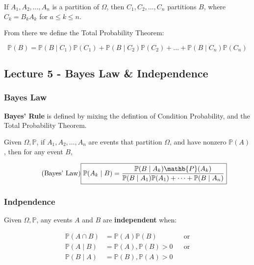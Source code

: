 \documentclass{article}
\begin{document}
If $A_1, A_2, \dots, A_n$ is a partition of $\Omega$, then $C_1, C_2,
\dots, C_n$ partitions $B$, where $C_k = B_k A_k$ for $a \leq k \leq
n$.

From there we define the Total Probability Theorem:

\begin{equation}
  \tag{Total Probability Theorem}
  \boxed{
    \mathbb{P}(B) = \mathbb{P}(B \mid C_1) \mathbb{P}(C_1) +
    \mathbb{P}(B \mid C_2) \mathbb{P}(C_2) + \dots + \mathbb{P}(B \mid
    C_n) \mathbb{P}(C_n)
  }
\end{equation}


\subsection{Lecture 5 - Bayes Law \& Independence}

\subsubsection{Bayes Law}

\textbf{Bayes' Rule} is defined by mixing the defintion of Condition
Probability, and the Total Probability Theorem.

Given $\Omega, \mathbb{P}$, if $A_1, A_2, \dots, A_n$ are events that
partition $\Omega$, and have nonzero $\mathbb{P}(A)$, then for any
event $B$,

\begin{equation}
  \tag{Bayes' Law}
  \boxed{
    \mathbb{P}(A_k \mid B) =
    \frac{\mathbb{P}(B \mid A_k) \mathb{P}(A_k)}
    {\mathbb{P}(B \mid A_1) \mathbb{P}(A_1) + \dots + \mathbb{P}(B
      \mid A_n)}
  }
\end{equation}

\subsubsection{Indpendence}

Given $\Omega, \mathbb{P}$, any events $A$ and $B$ are
\textbf{independent} when:

\begin{equation}
  \tag{Independence Def}
  \boxed{
    \begin{aligned}
      \mathbb{P}(A \cap B)
      &= \mathbb{P}(A) \mathbb{P}(B)
      && \text{or} \\
      \mathbb{P}(A \mid B)
      &= \mathbb{P}(A), \mathbb{P}(B) > 0
      && \text{or} \\
      \mathbb{P}(B \mid A)
      &= \mathbb{P}(B), \mathbb{P}(A) > 0
    \end{aligned}
  }
\end{equation}
\end{document}
